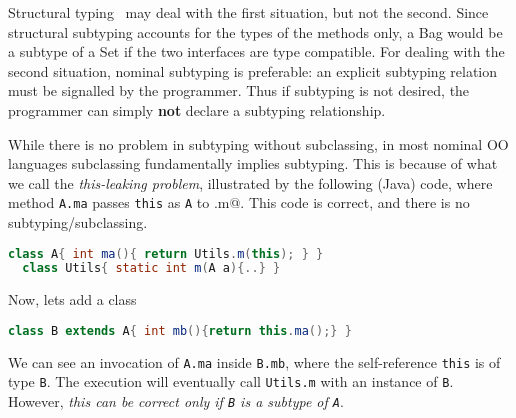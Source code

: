 \noindent Structural typing~\cite{cook} may deal with the first
situation, but not the second. Since structural subtyping
accounts for the types of the methods only, a Bag would be a subtype
of a Set if the two interfaces are type compatible. For dealing with
the second situation, nominal subtyping is preferable: an explicit subtyping relation must be signalled by the programmer. Thus if subtyping is not desired, the
programmer can simply {\bf not} declare a subtyping relationship.

While there is no problem in subtyping without subclassing, in most nominal OO languages subclassing fundamentally implies subtyping. 
This is because of what we call the
\emph{this-leaking problem}, illustrated by the following
(Java) code, where
method \lstinline{A.ma} passes \lstinline{this} as \lstinline{A} to \Q@Utils.m@.
This code is correct, and there is no subtyping/subclassing{.}\saveSpace\saveSpace
\begin{lstlisting}[language=Java]
  class A{ int ma(){ return Utils.m(this); } }
  class Utils{ static int m(A a){..} }
\end{lstlisting}
\saveSpace\saveSpace
  Now, lets add a class \Q@B@
\saveSpace\saveSpace\saveSpace
\begin{lstlisting}[language=Java]
  class B extends A{ int mb(){return this.ma();} }  
\end{lstlisting}
\saveSpace\saveSpace
\noindent We can see an invocation of \lstinline{A.ma} inside
\lstinline{B.mb}, where the self-reference \lstinline{this} is of type \lstinline{B}. 
The execution will eventually call \lstinline{Utils.m} with an
instance of \lstinline{B}. However, \emph{this can be correct only if \lstinline{B} is a subtype of
\lstinline{A}}. 

%
%



